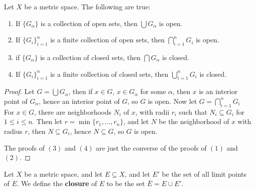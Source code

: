 \begin{theorem}\label{2.2.5}
    Let $X$ be a metric space. The following are true:
        \begin{enumerate}[label=(\arabic*)]
            \item If $\{G_{\alpha}\}$ is a collection of  open sets, then $\bigcup{G_{\alpha}}$ is open.

            \item If $\{G_i\}_{i=1}^n$ is a finite collection of open sets, then  $\bigcap_{i=1}^{n}{G_i}$ is open.

            \item if $\{G_{\alpha}\}$ is a collection of  closed sets, then $\bigcap{G_{\alpha}}$ is closed.

            \item If $\{G_i\}_{i=1}^n$ is a finite collection of closed sets, then  $\bigcup_{i=1}^{n}{G_i}$ is closed.
        \end{enumerate}
\end{theorem}
\begin{proof}
    Let $G=\bigcup{G_{\alpha}}$, then if $x \in G$,  $x \in G_{\alpha}$ for some $\alpha$, then 
    $x$ is an interior point of  $G_{\alpha}$, hence an interior point of  $G$, so  $G$ is open. 
    Now let  $G=\bigcap_{i=1}^{n}{G_i}$ For  $x \in G$, there are neighborhoods  $N_i$ of  $x$, with 
    radii  $r_i$ such that  $N_i \subseteq G_i$ for  $1 \leq i \leq n$. Then let  $r=\min\{r_1, \dots, r_n\}$, 
    and let $N$ be the neighborhood of  $x$ with radius  $r$, then  $N \subseteq G_i$, 
    hence  $N \subseteq G$, so  $G$ is open.

    The proofs of  $(3)$ and  $(4)$ are just the converse of the proofs of  $(1)$ and  $(2)$.
\end{proof}

\begin{definition}
    Let $X$ be a metric space, and let  $E \subseteq X$, and let  $E'$ be the set of all 
    limit points of $E$. We define the \textbf{closure} of $E$ to be the set $\bar{E}=E \cup E'$.
\end{definition}

